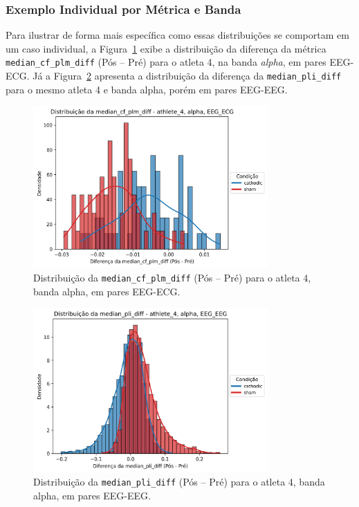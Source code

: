 \subsubsection{Exemplo Individual por Métrica e Banda}
Para ilustrar de forma mais específica como essas distribuições se comportam em um caso individual, a Figura~\ref{fig:median_cf_plm_diff_ath4_alpha_eeg_ecg} exibe a distribuição da diferença da métrica \texttt{median\_cf\_plm\_diff} (Pós -- Pré) para o atleta 4, na banda \emph{alpha}, em pares EEG-ECG. Já a Figura~\ref{fig:median_pli_diff_ath4_alpha_eeg_eeg} apresenta a distribuição da diferença da \texttt{median\_pli\_diff} para o mesmo atleta 4 e banda alpha, porém em pares EEG-EEG.

\begin{figure}[htb]
    \centering
    \includegraphics[width=0.8\textwidth]{figs/5_connectivity_metrics_individual_distribution/median_cf_plm_diff_athlete_4_alpha_EEG_ECG.png}
    \caption{Distribuição da \texttt{median\_cf\_plm\_diff} (Pós -- Pré) para o atleta 4, banda alpha, em pares EEG-ECG.}
    \label{fig:median_cf_plm_diff_ath4_alpha_eeg_ecg}
\end{figure}

\begin{figure}[htb]
    \centering
    \includegraphics[width=0.8\textwidth]{figs/5_connectivity_metrics_individual_distribution/median_pli_diff_athlete_4_alpha_EEG_EEG.png}
    \caption{Distribuição da \texttt{median\_pli\_diff} (Pós -- Pré) para o atleta 4, banda alpha, em pares EEG-EEG.}
    \label{fig:median_pli_diff_ath4_alpha_eeg_eeg}
\end{figure}

